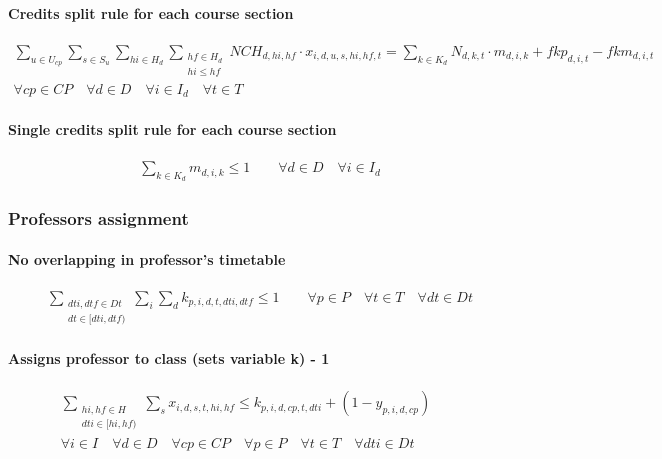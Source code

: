 \paragraph{Credits split rule for each course section}
\begin{eqnarray}
\sum\limits_{u \in U_{cp}} \sum\limits_{s \in S_{u}} \sum\limits_{hi \in H_{d}} \sum_{\substack {hf \in H_{d} \\ hi\le hf}}
 NCH_{d,hi,hf} \cdot x_{i,d,u,s,hi,hf,t} = \sum\limits_{k \in K_{d}}N_{d,k,t} \cdot m_{d,i,k} + fkp_{d,i,t} - fkm_{d,i,t} \nonumber \qquad 
\\
\forall cp \in CP \quad
\forall d \in D \quad
\forall i \in I_{d} \quad
\forall t \in T
\end{eqnarray}

\paragraph{Single credits split rule for each course section}
\begin{eqnarray}
\sum\limits_{k \in K_{d}} m_{d,i,k} \leq 1 \nonumber \qquad 
\forall d \in D \quad
\forall i \in I_{d}
\end{eqnarray}


\subsubsection{Professors assignment}

\paragraph{No overlapping in professor's timetable}
\begin{eqnarray}
\sum_{ \substack {dti,dtf \in Dt \\ dt \in [dti,dtf)} } \sum\limits_{i} \sum\limits_{d} k_{p,i,d,t,dti,dtf} \le 1 \nonumber \qquad
\forall p \in P \quad
\forall t \in T \quad
\forall dt \in Dt
\end{eqnarray}

\paragraph{Assigns professor to class (sets variable k) - 1}
\begin{eqnarray}
\sum_{ \substack {hi,hf \in H \\ dti \in [hi,hf)} } \sum\limits_{s} x_{i,d,s,t,hi,hf} \le k_{p,i,d,cp,t,dti} + ( 1 - y_{p,i,d,cp} ) \nonumber \qquad
\\
\forall i \in I \quad
\forall d \in D \quad
\forall cp \in CP \quad
\forall p \in P \quad
\forall t \in T \quad
\forall dti \in Dt
\end{eqnarray}
	

